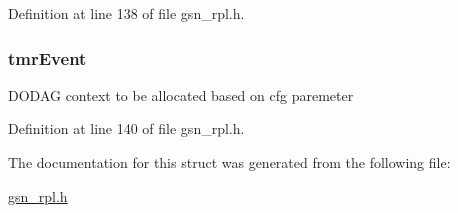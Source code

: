 Definition at line 138 of file gsn\_\-rpl.h.

\hypertarget{a00192_aabb98c76e20a07a00dd54e144a095487}{
\subsubsection[{tmrEvent}]{ {\bf tmrEvent}}}
\label{a00192_aabb98c76e20a07a00dd54e144a095487}
DODAG context to be allocated based on cfg paremeter 

Definition at line 140 of file gsn\_\-rpl.h.



The documentation for this struct was generated from the following file:\begin{DoxyCompactItemize}
\item 
\hyperlink{a00579}{gsn\_\-rpl.h}\end{DoxyCompactItemize}
